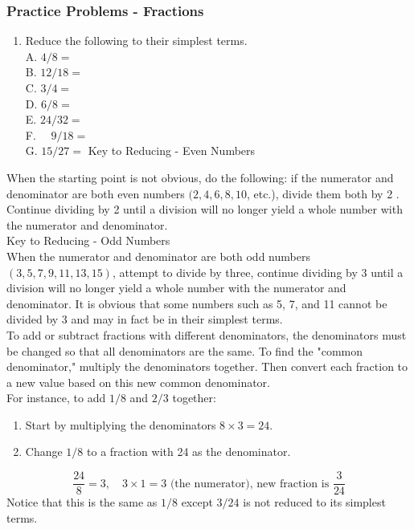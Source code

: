 \subsubsection{Practice Problems - Fractions}
\begin{enumerate}
  \item Reduce the following to their simplest terms.\\
A. $4 / 8=$\\
B. $12 / 18=$\\
C. $3 / 4=$\\
D. $6 / 8=$\\
E. $24 / 32=$\\
F. $\quad 9 / 18=$\\
G. $15 / 27=$ Key to Reducing - Even Numbers
\end{enumerate}
When the starting point is not obvious, do the following: if the numerator and denominator are both even numbers $(2,4,6,8,10$, etc.), divide them both by 2 . Continue dividing by 2 until a division will no longer yield a whole number with the numerator and denominator.\\

Key to Reducing - Odd Numbers\\

When the numerator and denominator are both odd numbers $(3,5,7,9,11,13,15)$, attempt to divide by three, continue dividing by 3 until a division will no longer yield a whole number with the numerator and denominator. It is obvious that some numbers such as 5, 7, and 11 cannot be divided by 3 and may in fact be in their simplest terms.\\


To add or subtract fractions with different denominators, the denominators must be changed so that all denominators are the same. To find the "common denominator," multiply the denominators together. Then convert each fraction to a new value based on this new common denominator.\\

For instance, to add $1 / 8$ and $2 / 3$ together:

\begin{enumerate}
  \item Start by multiplying the denominators $8 \times 3=24$.

  \item Change $1 / 8$ to a fraction with 24 as the denominator.

\end{enumerate}
$$
\frac{24}{8}=3, \quad 3 \times 1=3 \text { (the numerator), new fraction is } \frac{3}{24}
$$
Notice that this is the same as $1 / 8$ except $3 / 24$ is not reduced to its simplest terms.


